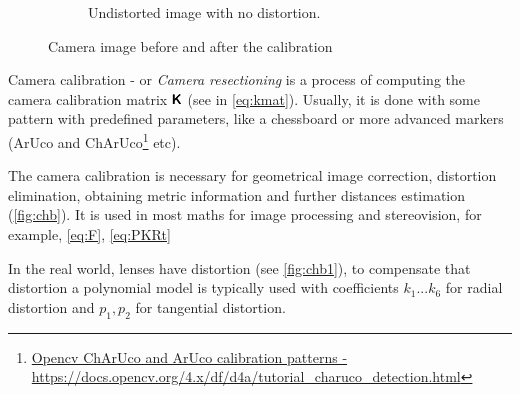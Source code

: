\begin{figure}[h]
\begin{subfigure}[b]{0.45\textwidth}
      \caption{Undistorted image with no distortion.}
      \label{fig:chb2}
    \end{subfigure}
    \caption{Camera image before and after the calibration}
    \label{fig:chb}
\end{figure}

Camera calibration - or \textit{Camera resectioning} is a process of computing the camera calibration matrix $\pmb{\mathsf{K}}$ (see in \eqref{eq:kmat}).
Usually, it is done with some pattern with predefined parameters, like a chessboard or more advanced markers (ArUco and ChArUco\footnote{\href{https://docs.opencv.org/4.x/df/d4a/tutorial_charuco_detection.html}{Opencv ChArUco and ArUco calibration patterns - \url{https://docs.opencv.org/4.x/df/d4a/tutorial_charuco_detection.html}}} etc).

The camera calibration is necessary for geometrical image correction, distortion elimination, obtaining metric information and further distances estimation (\autoref{fig:chb}). 
It is used in most maths for image processing and stereovision, for example, \eqref{eq:F}, \eqref{eq:PKRt}

In the real world, lenses have distortion (see \autoref{fig:chb1}), to compensate that distortion a polynomial model is typically used with coefficients $k_1 ... k_6$ for radial distortion and $p_1, p_2$ for tangential distortion.

